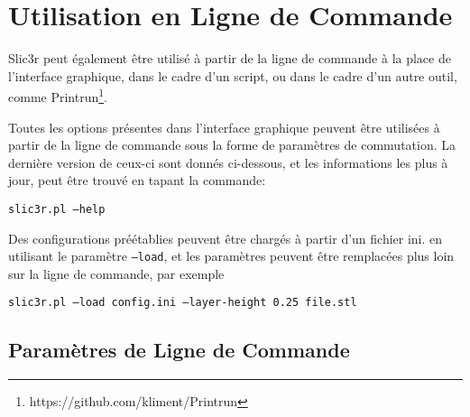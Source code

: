 
\section{Utilisation en Ligne de Commande} %
\label{sec:command_line_usage}

Slic3r peut également être utilisé à partir de la ligne de commande à la place de l'interface graphique, dans le cadre d'un script, ou dans le cadre d'un autre outil, comme Printrun\footnote{https://github.com/kliment/Printrun}.

Toutes les options présentes dans l'interface graphique peuvent être utilisées à partir de la ligne de commande sous la forme de paramètres de commutation. La dernière version de ceux-ci sont donnés ci-dessous, et les informations les plus à jour, peut être trouvé en tapant la commande: \par\texttt{slic3r.pl --help}

Des configurations préétablies peuvent être chargés à partir d'un fichier ini. en utilisant le paramètre \texttt{--load}, et les paramètres peuvent être remplacées plus loin sur la ligne de commande, par exemple \par\texttt{slic3r.pl --load config.ini --layer-height 0.25 file.stl}

\subsection{Paramètres de Ligne de Commande} %
\label{sub:command_line_options}

